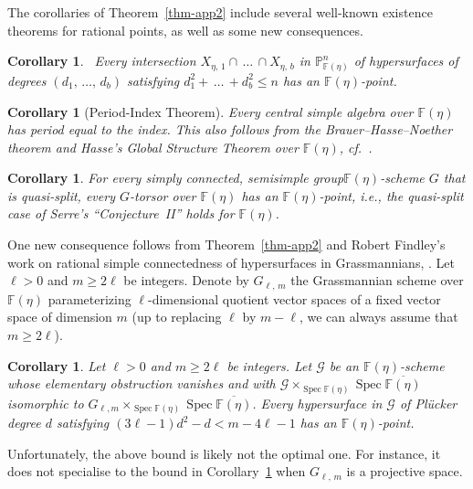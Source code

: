 \documentclass[11pt]{article}
\newtheorem{coro}[theo]{Corollary}
\theoremstyle{definition}
\numberwithin{equation}{section}
\numberwithin{figure}{section}
\numberwithin{table}{section}
\newcommand{\mbb}{\mathbb}
\newcommand{\PP}{\mbb{P}}
\newcommand{\FF}{\mbb{F}}
\newcommand{\mc}{\mathcal}
\newcommand{\mcG}{\mc{G}}
\newcommand{\ol}{\overline}
\newcommand{\Xx}{X}
\newcommand{\cb}{b}
\DeclareMathOperator{\SP}{Spec}
\begin{document}
The corollaries of Theorem~\ref{thm-app2} include several well-known existence theorems for rational points, as well as some new consequences.

\begin{coro}~\cite[Corollary, p.~378]{Lang52}\label{cor-case1}
Every intersection $\Xx_{\eta,\,1}\cap\,\dots\, \cap \Xx_{\eta,\,\cb}$ in $\PP^n_{\FF(\eta)}$ of hypersurfaces of degrees $(d_1,\,\dots,\,d_\cb)$ satisfying $d_1^2 +\,\dots\,+ d_\cb^2\leq n$ has an $\FF(\eta)$-point.
\end{coro}

\begin{coro}[Period-Index Theorem] \label{cor-case2}
Every central simple algebra over $\FF(\eta)$ has period equal to the index. This also follows from the Brauer--Hasse--Noether theorem and Hasse's Global Structure Theorem over $\FF(\eta)$, cf.~\cite[pp.~40--41]{Roquette}.
\end{coro}

\begin{coro}\cite{Harder} \label{cor-case3}
For every simply connected, semisimple group\linebreak$\FF(\eta)$-scheme $G$ that is quasi-split, every $G$-torsor over $\FF(\eta)$ has an $\FF(\eta)$-point, i.e., the quasi-split case of Serre's ``Conjecture~II'' holds for $\FF(\eta)$.
\end{coro}

One new consequence follows from Theorem~\ref{thm-app2} and Robert Findley's work on rational simple connectedness of hypersurfaces in Grassmannians, \cite[Theorem~1.8]{Findley}. Let $\ell>0$ and $m\geq 2\ell$ be integers. Denote by $G_{\ell,\,m}$ the Grassmannian scheme over $\FF(\eta)$ parameterizing $\ell$-dimensional quotient vector spaces of a fixed vector space of dimension $m$ (up to replacing $\ell$ by $m-\ell$, we can always assume that $m\geq 2\ell$).

\begin{coro}\label{cor-case4}
Let $\ell>0$ and $m\geq 2\ell$ be integers. Let $\mcG$ be an $\FF(\eta)$-scheme whose elementary obstruction vanishes and with $\mcG\times_{\SP \FF(\eta)} \SP \ol{\FF(\eta)}$ isomorphic to $G_{\ell,m}\times_{\SP \FF(\eta)} \SP \ol{\FF(\eta)}$. Every hypersurface in $\mcG$ of Pl\"ucker degree $d$ satisfying $(3\ell-1)d^2 - d < m-4\ell-1$ has an $\FF(\eta)$-point.
\end{coro}

Unfortunately, the above bound is likely not the optimal one. For instance, it does not specialise to the bound in Corollary~\ref{cor-case1} when $G_{\ell,\,m}$ is a projective space.
\end{document}
